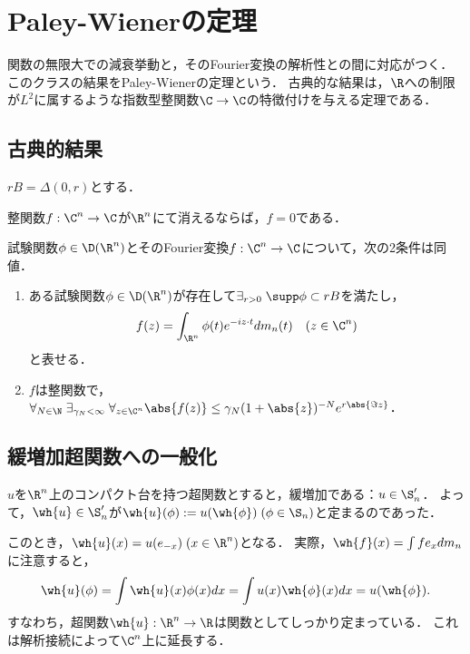 \documentclass[uplatex,dvipdfmx]{jsreport}
\begin{document}
\section{Paley-Wienerの定理}

\begin{tcolorbox}[colframe=ForestGreen, colback=ForestGreen!10!white,breakable,colbacktitle=ForestGreen!40!white,coltitle=black,fonttitle=\bfseries\sffamily,
title=コンパクト台を持つ緩増加関数のFourier変換は整関数を定める]
    関数の無限大での減衰挙動と，そのFourier変換の解析性との間に対応がつく．このクラスの結果をPaley-Wienerの定理という．
    古典的な結果は，$\R$への制限が$L^2$に属するような指数型整関数$\C\to\C$の特徴付けを与える定理である．
\end{tcolorbox}

\subsection{古典的結果}

\begin{notation}
    $rB=\Delta(0,r)$とする．
\end{notation}

\begin{lemma}
    整関数$f:\C^n\to\C$が$\R^n$にて消えるならば，$f=0$である．
\end{lemma}

\begin{theorem}
    試験関数$\phi\in\D(\R^n)$とそのFourier変換$f:\C^n\to\C$について，次の2条件は同値．
    \begin{enumerate}
        \item ある試験関数$\phi\in\D(\R^n)$が存在して$\exists_{r>0}\;\supp\phi\subset rB$を満たし，
        \[f(z)=\int_{\R^n}\phi(t)e^{-iz\cdot t}dm_n(t)\quad(z\in\C^n)\]
        と表せる．
        \item $f$は整関数で，$\forall_{N\in\N}\;\exists_{\gamma_N<\infty}\;\forall_{z\in\C^n}\abs{f(z)}\le\gamma_N(1+\abs{z})^{-N}e^{r\abs{\Im z}}$．
    \end{enumerate}
\end{theorem}

\subsection{緩増加超関数への一般化}

\begin{discussion}
    $u$を$\R^n$上のコンパクト台を持つ超関数とすると，緩増加である：$u\in\S'_n$．
    よって，$\wh{u}\in\S'_n$が$\wh{u}(\phi):=u(\wh{\phi})\;(\phi\in\S_n)$と定まるのであった．

    このとき，$\wh{u}(x)=u(e_{-x})\;(x\in\R^n)$となる．
    実際，$\wh{f}(x)=\int fe_xdm_n$に注意すると，
    \[\wh{u}(\phi)=\int\wh{u}(x)\phi(x)dx=\int u(x)\wh{\phi}(x)dx=u(\wh{\phi}).\]
    すなわち，超関数$\wh{u}:\R^n\to\R$は関数としてしっかり定まっている．
    これは解析接続によって$\C^n$上に延長する．
\end{discussion}
\end{document}
